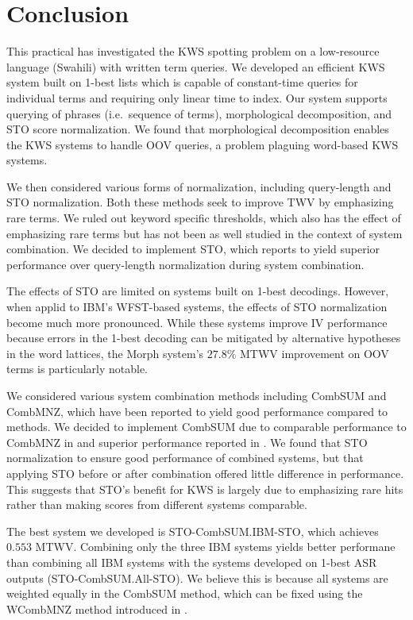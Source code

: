 \documentclass[a4paper,oneside,reqno]{amsart}
\begin{document}
\section{Conclusion}

This practical has investigated the KWS spotting problem on a low-resource
language (Swahili) with written term queries. We developed an efficient KWS
system built on 1-best lists which is capable of constant-time queries for
individual terms and requiring only linear time to index. Our system supports
querying of phrases (i.e.\ sequence of terms), morphological
decomposition\cite{narasimhan2014morphological}, and STO score normalization.
We found that morphological decomposition enables the KWS systems to handle OOV
queries, a problem plaguing word-based KWS systems.

We then considered various forms of normalization, including query-length and
STO normalization\cite{mamou2013system}.  Both these methods seek to improve
TWV by emphasizing rare terms. We ruled out keyword specific
thresholds\cite{wang2014depth}, which also has the effect of emphasizing rare
terms but has not been as well studied in the context of system combination. We
decided to implement STO, which \cite{mamou2013system} reports to yield
superior performance over query-length normalization during system combination.

The effects of STO are limited on systems built on 1-best decodings.
However, when applid to IBM's WFST-based systems, the effects of STO
normalization become much more pronounced. While these systems improve IV
performance because errors in the 1-best decoding can be mitigated by
alternative hypotheses in the word lattices, the Morph system's $27.8\%$ MTWV
improvement on OOV terms is particularly notable.

We considered various system combination methods including CombSUM and CombMNZ,
which have been reported to yield good performance compared to
methods\cite{lee1997analyses}. We decided to implement CombSUM due to
comparable performance to CombMNZ in \cite{lee1997analyses} and superior
performance reported in \cite{belkin1995combining}. We found that
STO normalization to ensure good performance of combined systems, but that
applying STO before or after combination offered little difference in performance.
This suggests that STO's benefit for KWS is largely due to emphasizing rare hits
rather than making scores from different systems comparable.

The best system we developed is STO-CombSUM.IBM-STO, which achieves $0.553$
MTWV.  Combining only the three IBM systems yields better performane than
combining all IBM systems with the systems developed on 1-best ASR outputs
(STO-CombSUM.All-STO). We believe this is because all systems are weighted
equally in the CombSUM method, which can be fixed using the WCombMNZ method
introduced in \cite{mamou2013system}.
\end{document}
